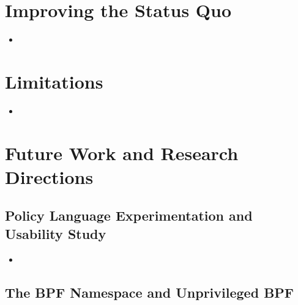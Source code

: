 \section{Improving the Status Quo}%
\label{s:disc-improving}


\begin{inprogress}
  \begin{itemize}
    \item
  \end{itemize}
\end{inprogress}


\section{Limitations}%
\label{s:disc-limitations}


\begin{inprogress}
  \begin{itemize}
    \item
  \end{itemize}
\end{inprogress}


\section{Future Work and Research Directions}%
\label{s:disc-future-work}


\subsection{Policy Language Experimentation and Usability Study}

\begin{inprogress}
  \begin{itemize}
    \item
  \end{itemize}
\end{inprogress}

\subsection{The BPF Namespace and Unprivileged BPF}


